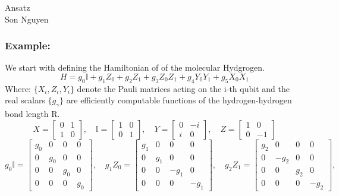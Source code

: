 \documentclass{article}
\begin{document}
\begin{center}
    \LARGE{Ansatz}\\[1em]
    \large Son Nguyen\\[1em]
\end{center}

\subsubsection*{Example:}
We start with defining the Hamiltonian of of the molecular Hydgrogen. 
\[H = g_0 \mathbb{I} + g_1 Z_0 + g_2 Z_1 + g_3 Z_0 Z_1 + g_4 Y_0 Y_1 + g_5 X_0 X_ 1\]
Where: $\{X_i, Z_i, Y_i\}$ denote the Pauli matrices acting on the i-th qubit and the real scalars $\{g_\gamma\}$ are efficiently computable functions of the hydrogen-hydrogen bond length R. 
\[
X = \begin{bmatrix}
0 & 1\\
1 & 0
\end{bmatrix} , \quad
\mathbb{I} = \begin{bmatrix}
1 & 0\\
0 & 1
\end{bmatrix}, \quad
Y = \begin{bmatrix}
0 & -i\\
i & 0
\end{bmatrix}, \quad
Z = \begin{bmatrix}
1 & 0\\
0 & -1
\end{bmatrix}
\]
\[g_0 \mathbb{I} = \begin{bmatrix}
g_0 & 0 & 0 & 0\\
0 & g_0 & 0 & 0\\
0 & 0 & g_0 & 0\\
0 & 0 & 0 & g_0
\end{bmatrix}, \quad
g_1 Z_0 = \begin{bmatrix}
g_1 & 0 & 0 & 0\\
0 & g_1 & 0 & 0\\
0 & 0 & -g_1 & 0\\
0 & 0 & 0 & -g_1
\end{bmatrix}, \quad 
g_2 Z_1 = \begin{bmatrix}
g_2 & 0 & 0 & 0\\
0 & -g_2 & 0 & 0\\
0 & 0 & g_2 & 0\\
0 & 0 & 0 & -g_2
\end{bmatrix}, \quad
\]
\\
\end{document}

